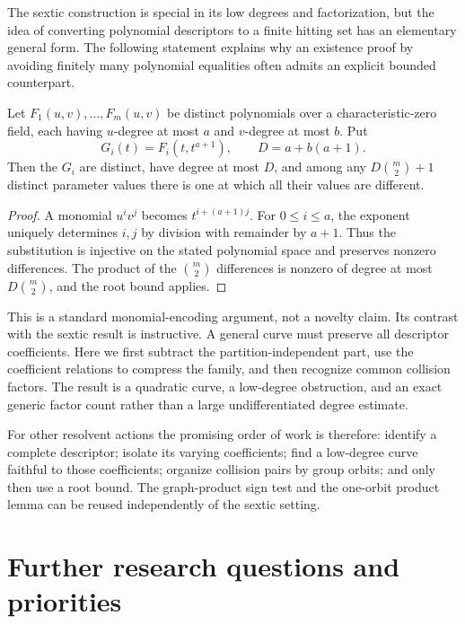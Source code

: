 \documentclass[11pt,letterpaper]{article}
\numberwithin{equation}{section}
\theoremstyle{definition}
\theoremstyle{remark}
\begin{document}
The sextic construction is special in its low degrees and factorization,
but the idea of converting polynomial descriptors to a finite hitting set
has an elementary general form. The following statement explains why an
existence proof by avoiding finitely many polynomial equalities often
admits an explicit bounded counterpart.

\begin{proposition}
\label{sbr:prop:kronecker}
Let $F_1(u,v),\ldots,F_m(u,v)$ be distinct polynomials over a
characteristic-zero field, each having $u$-degree at most $a$ and
$v$-degree at most $b$. Put
\[
 G_i(t)=F_i(t,t^{a+1}),\qquad D=a+b(a+1).
\]
Then the $G_i$ are distinct, have degree at most $D$, and among any
$D\binom m2+1$ distinct parameter values there is one at which all their
values are different.
\end{proposition}
\begin{proof}
A monomial $u^iv^j$ becomes $t^{i+(a+1)j}$. For $0\le i\le a$, the
exponent uniquely determines $i,j$ by division with remainder by $a+1$.
Thus the substitution is injective on the stated polynomial space and
preserves nonzero differences. The product of the $\binom m2$ differences
is nonzero of degree at most $D\binom m2$, and the root bound applies.
\end{proof}

This is a standard monomial-encoding argument, not a novelty claim. Its
contrast with the sextic result is instructive. A general curve must
preserve all descriptor coefficients. Here we first subtract the
partition-independent part, use the coefficient relations to compress
the family, and then recognize common collision factors. The result is a
quadratic curve, a low-degree obstruction, and an exact generic factor
count rather than a large undifferentiated degree estimate.

For other resolvent actions the promising order of work is therefore:
identify a complete descriptor; isolate its varying coefficients; find a
low-degree curve faithful to those coefficients; organize collision
pairs by group orbits; and only then use a root bound. The graph-product
sign test and the one-orbit product lemma can be reused independently of
the sextic setting.

\section{Further research questions and priorities}
\label{sbr:sec:questions}
\end{document}
